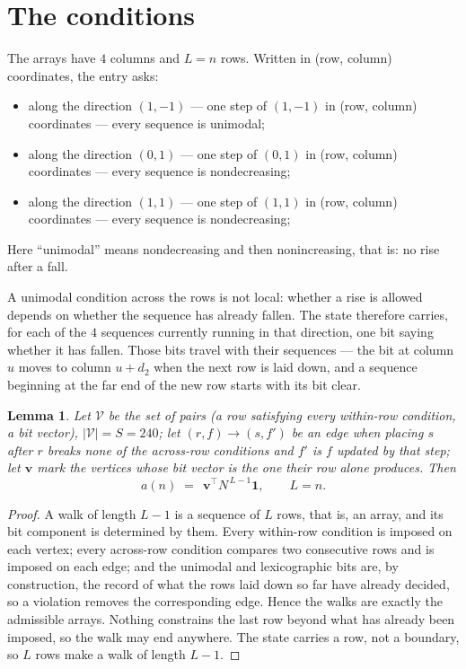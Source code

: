 \documentclass[11pt,a4paper]{article}
\theoremstyle{plain}
\newtheorem{lemma}[theorem]{Lemma}
\theoremstyle{definition}
\begin{document}
\section{The conditions}

The arrays have $4$ columns and $L=n$ rows. Written in (row, column)
coordinates, the entry asks:
\begin{itemize}
\item along the direction $(1,-1)$ --- one step of $(1,-1)$ in (row, column) coordinates --- every sequence is unimodal;
\item along the direction $(0,1)$ --- one step of $(0,1)$ in (row, column) coordinates --- every sequence is nondecreasing;
\item along the direction $(1,1)$ --- one step of $(1,1)$ in (row, column) coordinates --- every sequence is nondecreasing;
\end{itemize}
Here ``unimodal'' means nondecreasing and then nonincreasing, that is: no rise after a fall.

A unimodal condition across the rows is not local: whether a
rise is allowed depends on whether the sequence has already fallen. The state therefore
carries, for each of the $4$ sequences currently running in that direction, one bit saying
whether it has fallen. Those bits travel with their sequences --- the bit at column $u$
moves to column $u+d_2$ when the next row is laid down, and a sequence beginning at the
far end of the new row starts with its bit clear.

\begin{lemma}\label{lem:walk}
Let $\mathcal V$ be the set of pairs (a row satisfying every within-row condition, a
bit vector), $|\mathcal V|=S=240$; let $(r,f)\to(s,f')$ be an edge when placing $s$ after $r$
breaks none of the across-row conditions and $f'$ is $f$ updated by that step; let
$\mathbf{v}$ mark the vertices whose bit vector is the one their row alone produces.
Then
\[
a(n)\;=\;\,\mathbf{v}^{\!\top}N^{\,L-1}\mathbf{1},\qquad L=n.
\]
\end{lemma}

\begin{proof}
A walk of length $L-1$ is a sequence of $L$ rows, that is, an array, and its bit component
is determined by them. Every within-row condition is imposed on each vertex; every
across-row condition compares two consecutive rows and is imposed on each edge; and the
unimodal and lexicographic bits are, by construction, the record of what the rows laid down
so far have already decided, so a violation removes the corresponding edge. Hence the walks
are exactly the admissible arrays. Nothing constrains the last row beyond what has already
been imposed, so the walk may end anywhere. The state carries a row, not a boundary, so
$L$ rows make a walk of length $L-1$.
\end{proof}
\end{document}
